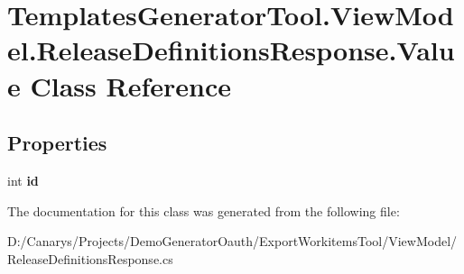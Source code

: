 \hypertarget{class_templates_generator_tool_1_1_view_model_1_1_release_definitions_response_1_1_value}{}\section{Templates\+Generator\+Tool.\+View\+Model.\+Release\+Definitions\+Response.\+Value Class Reference}
\label{class_templates_generator_tool_1_1_view_model_1_1_release_definitions_response_1_1_value}
\subsection*{Properties}
\begin{DoxyCompactItemize}
\item 
\mbox{\label{class_templates_generator_tool_1_1_view_model_1_1_release_definitions_response_1_1_value_afb5394a3fe8da222a178e6e806f2872c}} 
int {\bfseries id}
\end{DoxyCompactItemize}


The documentation for this class was generated from the following file\+:\begin{DoxyCompactItemize}
\item 
D\+:/\+Canarys/\+Projects/\+Demo\+Generator\+Oauth/\+Export\+Workitems\+Tool/\+View\+Model/Release\+Definitions\+Response.\+cs\end{DoxyCompactItemize}
